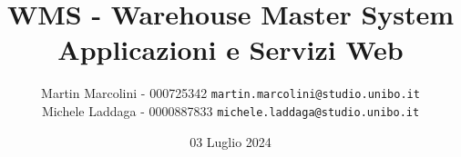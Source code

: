 
\begin{titlepage}
    \title{\LARGE WMS - Warehouse Master System \\[10pt] \large Applicazioni e Servizi Web}
    \author{
        Martin Marcolini - 000725342 \texttt{martin.marcolini@studio.unibo.it} \\[10pt]
        Michele Laddaga - 0000887833 \texttt{michele.laddaga@studio.unibo.it}
    }
    \date{03 Luglio 2024}
    \maketitle
\end{titlepage}
